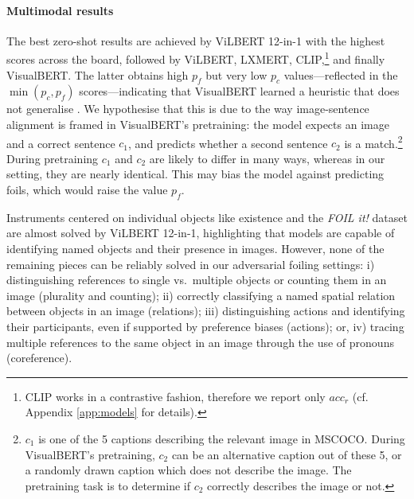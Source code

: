 \documentclass[11pt]{article}
\begin{document}
\paragraph{Multimodal results} The best zero-shot results are achieved by ViLBERT 12-in-1 with the highest scores across the board, followed by ViLBERT, LXMERT, CLIP,\footnote{CLIP works in a contrastive fashion, therefore we report only $acc_r$ (cf. Appendix \ref{app:models} for details).} and finally VisualBERT. The latter obtains high $p_f$ but very low $p_c$ values---reflected in the $\min(p_c,p_f)$ scores---indicating that VisualBERT learned a heuristic that does not generalise
\cite[see][for similar observations with other models]{Hendricks2021}. We hypothesise that this is due to the way image-sentence alignment is framed in VisualBERT's pretraining: the model expects an image and a correct sentence $c_{1}$, and predicts whether a second sentence $c_2$ is a match.\footnote{$c_1$ is one of the 5 captions describing the relevant image in MSCOCO. During VisualBERT's pretraining, $c_2$ can be an alternative caption out of these 5, or a randomly drawn caption which does not describe the image. The pretraining task is to determine if $c_2$ correctly describes the image or not.}
During pretraining $c_{1}$ and $c_{2}$ are likely to differ in 
many ways, whereas in our setting, they are nearly identical.
This may bias the model against predicting foils, which would raise the value $p_f$.



Instruments centered on individual objects like existence and the \textit{FOIL it!} dataset are almost solved by ViLBERT 12-in-1, highlighting that models are capable of identifying named objects and their presence in images. However, none of the remaining pieces can be reliably solved in our adversarial foiling settings: i) distinguishing references to single vs.\ multiple objects 
or counting them in an image (plurality and counting); ii) correctly classifying a named spatial relation between objects in an image (relations); iii) distinguishing actions and identifying their participants, even if supported by preference biases (actions); or, iv) tracing multiple references to the same object in an image through the use of pronouns (coreference).
\end{document}
